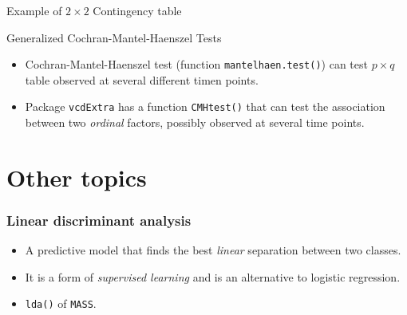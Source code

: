 \begin{frame}[fragile]{Example of $2\times 2$ Contingency table}
\begin{knitrout}\footnotesize
{}\color{fgcolor}\begin{kframe}
\begin{alltt}
 \hlkwb{<-} \hlopt{==}\hlstd{,} \hlstd{,} \hlstd{)}
 \hlkwb{<-} 
 \hlkwb{<-}         
\end{alltt}


{\ttfamily\noindent\color{warningcolor}{\#\# Warning in chisq.test(ctab1): Chi-squared approximation may be incorrect}}\begin{alltt}
\end{alltt}


{\ttfamily\noindent\color{warningcolor}{\#\# Warning in chisq.test(ctab2): Chi-squared approximation may be incorrect}}\begin{alltt}
\end{alltt}
\end{kframe}
\end{knitrout}

\end{frame}

\begin{frame}{Generalized Cochran-Mantel-Haenszel Tests}
  \begin{itemize}
  \item Cochran-Mantel-Haenszel test (function
    \texttt{mantelhaen.test()}) can test $p\times q$ table observed at
    several different timen points.
  \item Package \texttt{vcdExtra} has a function \texttt{CMHtest()}
    that can test the association between two \emph{ordinal} factors,
    possibly observed at several time points.
  \end{itemize}
\end{frame}

\section{Other topics}
\label{sec:other-topics}

\begin{frame}
  \frametitle{Linear discriminant analysis}
  \begin{itemize}
  \item A predictive model that finds the best \emph{linear}
    separation between two classes.
  \item It is a form of \emph{supervised learning} and is an
    alternative to logistic regression.
  \item \texttt{lda()} of \texttt{MASS}.
  \end{itemize}
\end{frame}

